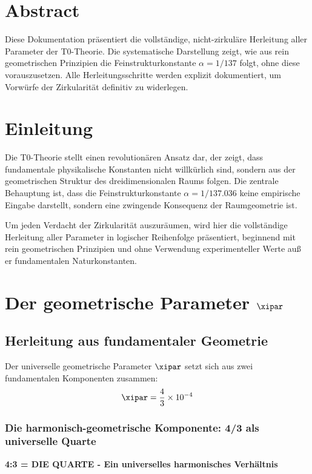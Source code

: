 \hfuzz=10pt
\section*{Abstract}
		Diese Dokumentation präsentiert die vollständige, nicht-zirkuläre Herleitung aller Parameter der T0-Theorie. Die systematische Darstellung zeigt, wie aus rein geometrischen Prinzipien die Feinstrukturkonstante $\alpha = 1/137$ folgt, ohne diese vorauszusetzen. Alle Herleitungsschritte werden explizit dokumentiert, um Vorwürfe der Zirkularität definitiv zu widerlegen.

	
	\section{Einleitung}
	
	Die T0-Theorie stellt einen revolutionären Ansatz dar, der zeigt, dass fundamentale physikalische Konstanten nicht willkürlich sind, sondern aus der geometrischen Struktur des dreidimensionalen Raums folgen. Die zentrale Behauptung ist, dass die Feinstrukturkonstante $\alpha = 1/137.036$ keine empirische Eingabe darstellt, sondern eine zwingende Konsequenz der Raumgeometrie ist.
	
	Um jeden Verdacht der Zirkularität auszuräumen, wird hier die vollständige Herleitung aller Parameter in logischer Reihenfolge präsentiert, beginnend mit rein geometrischen Prinzipien und ohne Verwendung experimenteller Werte auß er fundamentalen Naturkonstanten.
\section{Der geometrische Parameter $\xipar$}

\subsection{Herleitung aus fundamentaler Geometrie}

Der universelle geometrische Parameter $\xipar$ setzt sich aus zwei fundamentalen Komponenten zusammen:
\begin{equation}
	\xipar = \frac{4}{3} \times 10^{-4}
\end{equation}

\subsubsection{Die harmonisch-geometrische Komponente: 4/3 als universelle Quarte}

\textbf{4:3 = DIE QUARTE - Ein universelles harmonisches Verhältnis}

